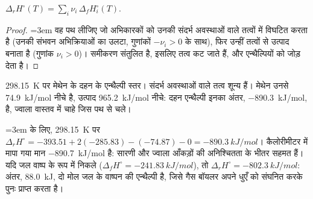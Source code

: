 \begin{proposition}[संभवन एन्थैल्पियों से अभिक्रिया एन्थैल्पी]\label{prop:b2:reaction-enthalpy:formation-sum}
$\Delta_r H^\circ(T) = \sum_i\nu_i\,\Delta_f H_i^\circ(T)$.
\end{proposition}

\begin{proof}\emergencystretch=3em
वह पथ लीजिए जो अभिकारकों को उनकी संदर्भ अवस्थाओं वाले तत्वों में
विघटित करता है (उनकी संभवन अभिक्रियाओं का उलटा, गुणांकों
$-\nu_i > 0$ के साथ), फिर उन्हीं तत्वों से उत्पाद बनाता है
(गुणांक $\nu_i > 0$)। समीकरण संतुलित है, इसलिए तत्व कट जाते हैं,
और  एन्थैल्पियों को जोड़ देता है।
\end{proof}

\begin{omfigure}

{\small \qty{298.15}{K} पर मेथेन के दहन के एन्थैल्पी स्तर।
संदर्भ अवस्थाओं वाले तत्व शून्य हैं। मेथेन उनसे
\qty{74.9}{kJ/mol} नीचे है, उत्पाद \qty{965.2}{kJ/mol} नीचे:
दहन एन्थैल्पी इनका अंतर, \qty{-890.3}{kJ/mol}, है, ज्वाला वास्तव में
चाहे जिस पथ से चले।}
\end{omfigure}

\begin{example}[मेथेन का दहन]\label{ex:b2:reaction-enthalpy:methane}\emergencystretch=3em
 के लिए,
\qty{298.15}{K} पर $\Delta_r H^\circ = -393.51 + 2(-285.83) - (-74.87) - 0 =
\qty{-890.3}{kJ/mol}$। कैलोरीमीटर में मापा गया मान
\qty{-890.7}{kJ/mol} है: सारणी और ज्वाला आँकड़ों की अनिश्चितता के भीतर
सहमत हैं। यदि जल वाष्प के रूप में निकले
($\Delta_f H^\circ = \qty{-241.83}{kJ/mol}$), तो $\Delta_r H^\circ =
\qty{-802.3}{kJ/mol}$: अंतर, \qty{88.0}{kJ}, दो मोल जल के वाष्पन की
एन्थैल्पी है, जिसे गैस बॉयलर अपने धुएँ को संघनित करके
पुनः प्राप्त करता है।
\end{example}

